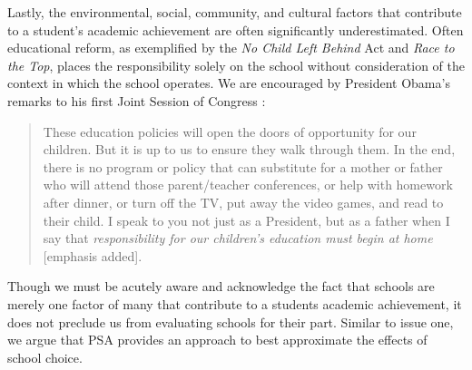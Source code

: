 \documentclass[letterpaper,12p,twoside]{article} %
\renewcommand{\normalsize}{\fontsize{12}{13}\selectfont}
\begin{document}
Lastly, the environmental, social, community, and cultural factors that contribute to a student's academic achievement are often significantly underestimated. Often educational reform, as exemplified by the \textit{No Child Left Behind} Act and \textit{Race to the Top}, places the responsibility solely on the school without consideration of the context in which the school operates. We are encouraged by President Obama's remarks to his first Joint Session of Congress \cite{Obama2009}:

\begin{quote} \normalsize
These education policies will open the doors of opportunity for our children. But it is up to us to ensure they walk through them. In the end, there is no program or policy that can substitute for a mother or father who will attend those parent/teacher conferences, or help with homework after dinner, or turn off the TV, put away the video games, and read to their child. I speak to you not just as a President, but as a father when I say that \textit{responsibility for our children's education must begin at home} [emphasis added].
\end{quote}

\noindent Though we must be acutely aware and acknowledge the fact that schools are merely one factor of many that contribute to a students academic achievement, it does not preclude us from evaluating schools for their part. Similar to issue one, we argue that PSA provides an approach to best approximate the effects of school choice.


\end{document}
